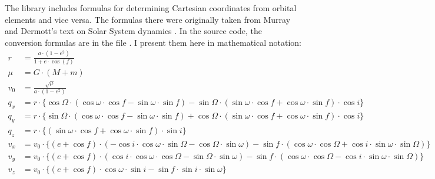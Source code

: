 The  library includes formulas for determining Cartesian coordinates from orbital elements and vice versa.
The formulas there were originally taken from Murray and Dermott's text on Solar System dynamics \cite{SSD}.
In the  source code, the conversion formulas are in the file .
I present them here in mathematical notation:
\begin{align*}
r &= \frac{a \cdot (1 - e^2) }{1 + e \cdot \cos (f) } \\
\mu &= G \cdot (M + m) \\
v_0 &= \frac{\sqrt{ \mu}}{{a \cdot (1 - e^2)}} \\
q_x &= r \cdot \lbrace 
\cos \Omega \cdot (\cos \omega \cdot \cos f - \sin \omega \cdot \sin f) - 
\sin \Omega \cdot (\sin \omega \cdot \cos f +\cos \omega \cdot \sin f ) 
\cdot \cos i \rbrace \\
q_y &= r \cdot \lbrace 
\sin \Omega \cdot (\cos \omega \cdot \cos f - \sin \omega \cdot \sin f) + 
\cos \Omega \cdot (\sin \omega \cdot \cos f +\cos \omega \cdot \sin f )
 \cdot \cos i \rbrace \\
q_z &= r \cdot \lbrace (\sin \omega \cdot \cos f + \cos \omega \cdot \sin f) \cdot \sin i \rbrace \\
v_x &= v_0 \cdot \lbrace 
(e + \cos f) 
\cdot (-\cos i \cdot \cos \omega \cdot \sin \Omega - \cos \Omega \cdot \sin \omega) - 
\sin f \cdot  (\cos \omega \cdot \cos \Omega + \cos i \cdot \sin \omega \cdot \sin \Omega) 
\rbrace \\
v_y &= v_0 \cdot \lbrace 
(e + \cos f) 
\cdot (\cos i \cdot \cos \omega \cdot \cos \Omega - \sin \Omega \cdot \sin \omega) - 
\sin f \cdot  (\cos \omega \cdot \cos \Omega - \cos i \cdot \sin \omega \cdot \sin \Omega) 
\rbrace \\
v_z &= v_0 \cdot \lbrace 
(e + \cos f) \cdot \cos \omega \cdot \sin i - \sin f \cdot \sin i \cdot \sin \omega
\rbrace
\end{align*}

